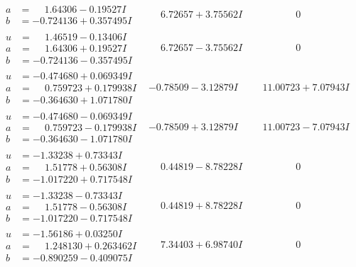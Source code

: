 \documentclass[1p]{elsarticle_modified}
\theoremstyle{definition}
\begin{document}
$$\begin{array}{c|c|c}
\begin{aligned}
a &= \phantom{-}1.64306 - 0.19527 I \\
b &= -0.724136 + 0.357495 I\end{aligned}
 & \phantom{-}6.72657 + 3.75562 I & \phantom{-0.000000 } 0 \\ \hline\begin{aligned}
u &= \phantom{-}1.46519 - 0.13406 I \\
a &= \phantom{-}1.64306 + 0.19527 I \\
b &= -0.724136 - 0.357495 I\end{aligned}
 & \phantom{-}6.72657 - 3.75562 I & \phantom{-0.000000 } 0 \\ \hline\begin{aligned}
u &= -0.474680 + 0.069349 I \\
a &= \phantom{-}0.759723 + 0.179938 I \\
b &= -0.364630 + 1.071780 I\end{aligned}
 & -0.78509 - 3.12879 I & \phantom{-}11.00723 + 7.07943 I \\ \hline\begin{aligned}
u &= -0.474680 - 0.069349 I \\
a &= \phantom{-}0.759723 - 0.179938 I \\
b &= -0.364630 - 1.071780 I\end{aligned}
 & -0.78509 + 3.12879 I & \phantom{-}11.00723 - 7.07943 I \\ \hline\begin{aligned}
u &= -1.33238 + 0.73343 I \\
a &= \phantom{-}1.51778 + 0.56308 I \\
b &= -1.017220 + 0.717548 I\end{aligned}
 & \phantom{-}0.44819 - 8.78228 I & \phantom{-0.000000 } 0 \\ \hline\begin{aligned}
u &= -1.33238 - 0.73343 I \\
a &= \phantom{-}1.51778 - 0.56308 I \\
b &= -1.017220 - 0.717548 I\end{aligned}
 & \phantom{-}0.44819 + 8.78228 I & \phantom{-0.000000 } 0 \\ \hline\begin{aligned}
u &= -1.56186 + 0.03250 I \\
a &= \phantom{-}1.248130 + 0.263462 I \\
b &= -0.890259 - 0.409075 I\end{aligned}
 & \phantom{-}7.34403 + 6.98740 I & \phantom{-0.000000 } 0 \\ \hline\begin{aligned}

\end{aligned}
\end{array}$$
\end{document}

